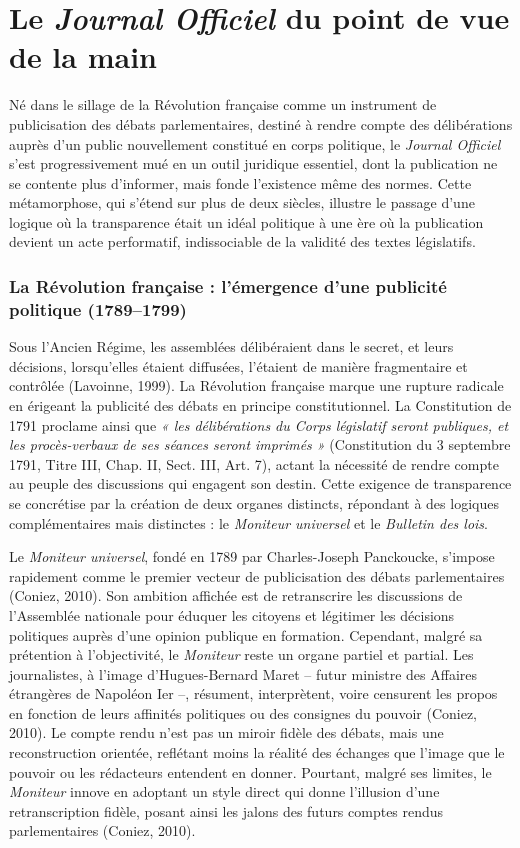 \section{Le \emph{Journal Officiel} du point de vue de la main}

Né dans le sillage de la Révolution française comme un instrument de publicisation des débats parlementaires, destiné à rendre compte des délibérations auprès d’un public nouvellement constitué en corps politique, le \emph{Journal Officiel} s’est progressivement mué en un outil juridique essentiel, dont la publication ne se contente plus d’informer, mais fonde l’existence même des normes. Cette métamorphose, qui s’étend sur plus de deux siècles, illustre le passage d’une logique où la transparence était un idéal politique à une ère où la publication devient un acte performatif, indissociable de la validité des textes législatifs.

\subsubsection{La Révolution française : l’émergence d’une publicité politique (1789–1799)}

Sous l’Ancien Régime, les assemblées délibéraient dans le secret, et leurs décisions, lorsqu’elles étaient diffusées, l’étaient de manière fragmentaire et contrôlée (Lavoinne, 1999). La Révolution française marque une rupture radicale en érigeant la publicité des débats en principe constitutionnel. La Constitution de 1791 proclame ainsi que \emph{« les délibérations du Corps législatif seront publiques, et les procès-verbaux de ses séances seront imprimés »} (Constitution du 3 septembre 1791, Titre III, Chap. II, Sect. III, Art. 7), actant la nécessité de rendre compte au peuple des discussions qui engagent son destin. Cette exigence de transparence se concrétise par la création de deux organes distincts, répondant à des logiques complémentaires mais distinctes : le \emph{Moniteur universel} et le \emph{Bulletin des lois}.

Le \emph{Moniteur universel}, fondé en 1789 par Charles-Joseph Panckoucke, s’impose rapidement comme le premier vecteur de publicisation des débats parlementaires (Coniez, 2010). Son ambition affichée est de retranscrire les discussions de l’Assemblée nationale pour éduquer les citoyens et légitimer les décisions politiques auprès d’une opinion publique en formation. Cependant, malgré sa prétention à l’objectivité, le \emph{Moniteur} reste un organe partiel et partial. Les journalistes, à l’image d’Hugues-Bernard Maret – futur ministre des Affaires étrangères de Napoléon Ier –, résument, interprètent, voire censurent les propos en fonction de leurs affinités politiques ou des consignes du pouvoir (Coniez, 2010). Le compte rendu n’est pas un miroir fidèle des débats, mais une reconstruction orientée, reflétant moins la réalité des échanges que l’image que le pouvoir ou les rédacteurs entendent en donner. Pourtant, malgré ses limites, le \emph{Moniteur} innove en adoptant un style direct qui donne l’illusion d’une retranscription fidèle, posant ainsi les jalons des futurs comptes rendus parlementaires (Coniez, 2010).

